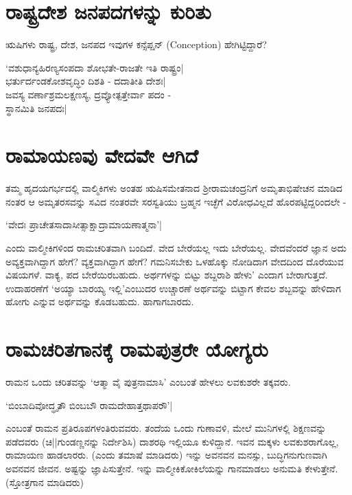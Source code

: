 \section*{ರಾಷ್ಟ್ರದೇಶ ಜನಪದಗಳನ್ನು ಕುರಿತು}

ಋಷಿಗಳು ರಾಷ್ಟ್ರ, ದೇಶ, ಜನಪದ ಇವುಗಳ ಕನ್ಸೆಪ್ಷನ್ ({\eng Conception}) ಹೇಗಿಟ್ಟಿದ್ದಾರೆ?

\begin{shloka}
`ವಶುಧಾನ್ಯಹಿರಣ್ಯಸಂಪದಾ ಶೋಭತೇ-ರಾಜತೇ ಇತಿ ರಾಷ್ಟ್ರಂ|\label{227}\\
ಭರ್ತುರ್ದಂಡಕೋಶವೃದ್ಧಿಂ ದಿಶತಿ - ದದಾತೀತಿ ದೇಶಃ|\\
ಜವಸ್ಯ ವರ್ಣಾಶ್ರಮಲಕ್ಷಣಸ್ಯ, ದ್ರವ್ಯೋತ್ಪತ್ತೇರ್ವಾ ಪದಂ -\\
ಸ್ಥಾನಮಿತಿ ಜನಪದಃ|
\end{shloka}

\section*{ರಾಮಾಯಣವು ವೇದವೇ ಆಗಿದೆ}

ತಮ್ಮ ಹೃದಯಗರ್ಭದಲ್ಲಿ ವಾಲ್ಮಿಕಿಗಳು ಅಂತಹ ಋಷಿಸಮೇತನಾದ ಶ್ರೀರಾಮಚಂದ್ರನಿಗೆ ಅಮೃತಾಭಿಷೇಚನ ಮಾಡಿದ ನಂತರ ಆ ಅಮೃತರಸವನ್ನು ಸವಿದ ನಂತರವೇ ಸರಸ್ವತಿಯು ಬ್ರಹ್ಮನ ಇಚ್ಛೆಗೆ ವಿರೋಧವಿಲ್ಲದೆ ಹೊರಪಟ್ಟಿದ್ದರಿಂದಲೇ -

\begin{shloka}
`ವೇದಃ ಪ್ರಾಚೇತಸಾದಾಸೀತ್ಸಾಕ್ಷಾದ್ರಾಮಾಯಣಾತ್ಮನಾ'|\label{228b}
\end{shloka}
ಎಂದು ವಾಲ್ಮೀಕಿಗಳಿಂದ ರಾಮಚರಿತವಾಗಿ ಬಂದಿದೆ. ವೇದ ಬೇರೆಯಲ್ಲ ಇದು ಬೇರೆಯಲ್ಲ. ವೇದವೆಂದರೆ ಜ್ಞಾನ ಅದು ಅವ್ಯಕ್ತವಾಗಿದ್ದಾಗ ಹೇಗೆ? ವ್ಯಕ್ತವಾಗಿದ್ದಾಗ ಹೇಗೆ? ಗಮನಿಸಬೇಕು ಒಳಹೊಕ್ಕು ನೋಡಿದಾಗ ವೇದದಿಂದ ದೊರೆಯುವ ವಿಷಯಗಳೆ. ವಾಕ್ಯ, ಪದ ಬೇರೆಯಿರಬಹುದು. ಅರ್ಥಗಳನ್ನು ಬಿಟ್ಟು ಶಬ್ದರಾಶಿ ಹೇಳು' ಎಂದಾಗ ಬೇರಾಗುತ್ತದೆ. ಉದಾಹರಣೆಗೆ `ಅಯ್ಯಾ ಬಾರಯ್ಯ ಇಲ್ಲಿ'ಎಂಬುದರ ಉಚ್ಚಾರಣೆ ಅರ್ಥವನ್ನು ಬಿಟ್ಟಾಗ ಕೇವಲ ಶಬ್ಬವನ್ನು ಹೇಳಿದಾಗ ಹೋಗು ಎನ್ನುವ ಅರ್ಥವನ್ನು ಕೊಡಬಹುದು. ಹಾಗಾಗಬಾರದು.

\section*{ರಾಮಚರಿತಗಾನಕ್ಕೆ ರಾಮಪುತ್ರರೇ ಯೋಗ್ಯರು}

ರಾಮನ ಒಂದು ಚರಿತವನ್ನು `ಆತ್ಮಾ ವೈ ಪುತ್ರನಾಮಾಸಿ'\label{228} ಎಂಬಂತೆ ಹೇಳಲು ಲವಕುಶರೇ ತಕ್ಕವರು.

\begin{shloka}
`ಬಿಂಬಾದಿವೋದ್ಧೃತೌ ಬಿಂಬಬೌ ರಾಮದೇಹಾತ್ತಥಾಪರೌ'|\label{228a}
\end{shloka}
ಎಂಬಂತೆ ರಾಮನ ಪ್ರತಿರೂಪಗಳಂತಿರುವವರು. ತಂದೆಯ ಒಂದು ಗುಣಾವಳಿ, ಮೇಲೆ ಮುನಿಗಳಲ್ಲಿ ಶಿಕ್ಷಣವನ್ನು ಪಡೆದವರು (ಚಿ||ಗುಂಡಣ್ಣನನ್ನು ನಿರ್ದೇಶಿಸಿ) ದಾಶರಥಿ ಇಲ್ಲಿಯೂ ಕುಳಿದ್ದಾನೆ. ಇವನ ಮಕ್ಕಳು ಲವಕುಶರಾಗೊಲ್ಲ, ರಾಮಾಯಣ ಹಾಡಲಾರರು. (ಎಂದು ತಮಾಷೆ ಮಾಡಿದರು) ಇನ್ನು ಅವನವನ ಮನಸ್ಸು, ಬುದ್ಧಿಗನುಗುಣವಾಗಿ ಅವನವನ ಜೀವನ. ಅಷ್ಟನ್ನು ಜ್ಞಾಪಿಸುತ್ತೇನೆ. ಇನ್ನು ವಾಲ್ಮೀಕಿಕೋಕಿಲೆಯನ್ನು ಗಾನಮಾಡಲು ಅನುಮತಿ ಕೇಳುತ್ತೇನೆ. (ಸ್ತೋತ್ರಗಾನ ಮಾಡಿದರು)

